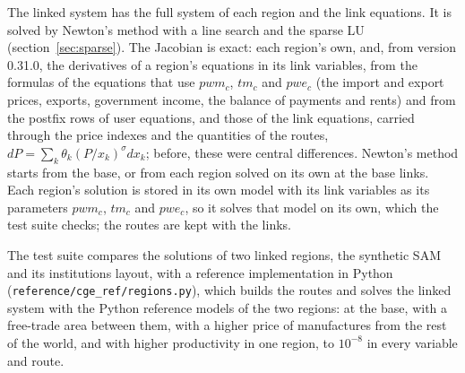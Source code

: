 The linked system has the full system of each region and the link equations.
It is solved by Newton's method with a line search and the sparse LU
(section~\ref{sec:sparse}). The Jacobian is exact: each region's own, and,
from version 0.31.0, the derivatives of a region's equations in its link
variables, from the formulas of the equations that use $pwm_c$, $tm_c$ and
$pwe_c$ (the import and export prices, exports, government income, the balance
of payments and rents) and from the postfix rows of user equations, and those
of the link equations, carried through the price indexes and the quantities
of the routes, $dP = \sum_k \theta_k (P/x_k)^{\sigma} dx_k$; before, these
were central differences. Newton's method starts from the base, or from each region solved
on its own at the base links. Each region's solution is stored in its own
model with its link variables as its parameters $pwm_c$, $tm_c$ and $pwe_c$, so
it solves that model on its own, which the test suite checks; the routes are
kept with the links.

The test suite compares the solutions of two linked regions, the synthetic SAM
and its institutions layout, with a reference implementation in Python
(\texttt{reference/cge\_ref/regions.py}), which builds the routes and solves the
linked system with the Python reference models of the two regions: at the
base, with a free-trade area between them, with a higher price of
manufactures from the rest of the world, and with higher productivity in one
region, to $10^{-8}$ in every variable and route.
